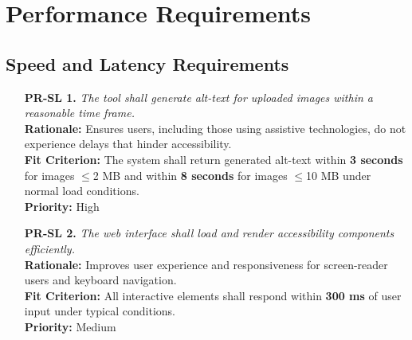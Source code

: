 \documentclass[12pt]{article}
\begin{document}
\section{Performance Requirements}

\subsection{Speed and Latency Requirements}
\begin{itemize}
  \item[\textbf{PR-SL 1.}] \textit{The tool shall generate alt-text
    for uploaded images within a reasonable time frame.}\\
    \textbf{Rationale:} Ensures users, including those using
    assistive technologies, do not experience delays that hinder
    accessibility.\\
    \textbf{Fit Criterion:} The system shall return generated
    alt-text within \textbf{3 seconds} for images $\leq$2 MB and
    within \textbf{8 seconds} for images $\leq$10 MB under normal
    load conditions.\\
    \textbf{Priority:} High

  \item[\textbf{PR-SL 2.}] \textit{The web interface shall load and
    render accessibility components efficiently.}\\
    \textbf{Rationale:} Improves user experience and responsiveness
    for screen-reader users and keyboard navigation.\\
    \textbf{Fit Criterion:} All interactive elements shall respond
    within \textbf{300 ms} of user input under typical conditions.\\
    \textbf{Priority:} Medium
\end{itemize}
\end{document}
